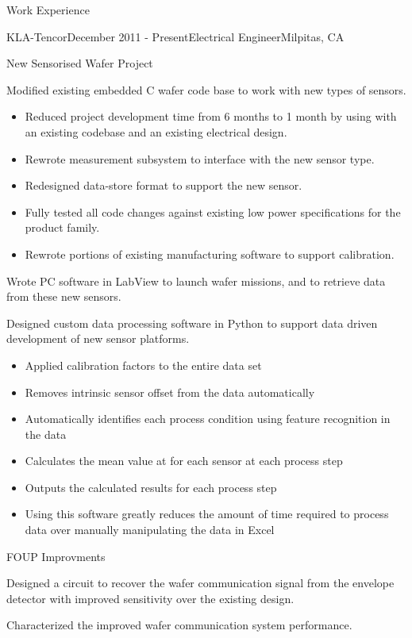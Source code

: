 \documentclass{resume} %
\begin{document}
\begin{rSection}{Work Experience}
\begin{rSubsection}{KLA-Tencor}{December 2011 - Present}{Electrical Engineer}{Milpitas, CA}
\begin{rWorkProject}{New Sensorised Wafer Project}
\item Modified existing embedded C wafer code base to work with new types of sensors.
\begin{itemize}
\itemsep -0.5em \vspace{-0.5em}
\renewcommand{\labelitemi}{-}
\item Reduced project development time from 6 months to 1 month by using with an existing codebase and an existing electrical design.
\item Rewrote measurement subsystem to interface with the new sensor type.
\item Redesigned data-store format to support the new sensor.
\item Fully tested all code changes against existing low power specifications for the product family.
\item Rewrote portions of existing manufacturing software to support calibration.
\end{itemize}

\item Wrote PC software in LabView to launch wafer missions, and to retrieve data from these new sensors.
\item Designed custom data processing software in Python to support data driven development of new sensor platforms.
\begin{itemize}
\itemsep -0.5em \vspace{-0.5em}
\renewcommand{\labelitemi}{-}
\item Applied calibration factors to the entire data set
\item Removes intrinsic sensor offset from the data automatically
\item Automatically identifies each process condition using feature recognition in the data
\item Calculates the mean value at for each sensor at each process step
\item Outputs the calculated results for each process step
\item Using this software greatly reduces the amount of time required to process data over manually manipulating the data in Excel
\end{itemize}
\end{rWorkProject}


\begin{rWorkProject}{FOUP Improvments}
\item Designed a circuit to recover the wafer communication signal from the envelope detector with improved sensitivity over the existing design.
\item Characterized the improved wafer communication system performance.
\end{rWorkProject}


\end{rSubsection}
\end{rSection}
\end{document}
